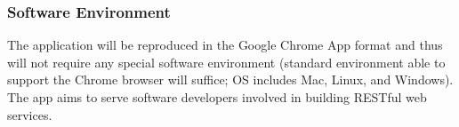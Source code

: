 \documentclass{article}
\begin{document}
\subsubsection{ Software​ ​Environment  }
The application will be reproduced in the Google Chrome App format and thus will not require any special software environment (standard environment able to support the Chrome browser will suffice; OS includes Mac, Linux, and Windows). The app aims to serve software developers involved​ ​in​ ​building​ ​RESTful​ ​web​ ​services. 









\end{document}
